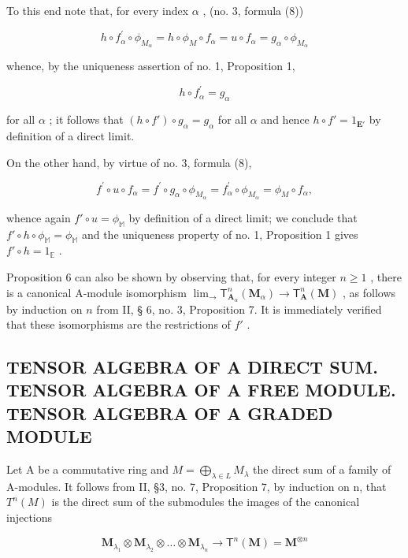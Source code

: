 To this end note that, for every index \(\alpha\) , (no. 3, formula (8))

\[
h \circ f _ {\alpha} ^ {\prime} \circ \phi_ {M _ {\alpha}} = h \circ \phi_ {M} \circ f _ {\alpha} = u \circ f _ {\alpha} = g _ {\alpha} \circ \phi_ {M _ {\alpha}}
\]

whence, by the uniqueness assertion of no. 1, Proposition 1,

\[
h \circ f _ {\alpha} ^ {\prime} = g _ {\alpha}
\]

for all \(\alpha\) ; it follows that \((h \circ f') \circ g_{\alpha} = g_{\alpha}\) for all \(\alpha\) and hence \(h \circ f' = 1_{\mathbf{E}'}\) by definition of a direct limit.

On the other hand, by virtue of no. 3, formula (8),

\[
f ^ {\prime} \circ u \circ f _ {\alpha} = f ^ {\prime} \circ g _ {\alpha} \circ \phi_ {M _ {\alpha}} = f _ {\alpha} ^ {\prime} \circ \phi_ {M _ {\alpha}} = \phi_ {M} \circ f _ {\alpha},
\]

whence again \(f' \circ u = \phi_{\mathbb{M}}\) by definition of a direct limit; we conclude that \(f' \circ h \circ \phi_{\mathbb{M}} = \phi_{\mathbb{M}}\) and the uniqueness property of no. 1, Proposition 1 gives \(f' \circ h = 1_{\mathbb{E}}\) .

Proposition 6 can also be shown by observing that, for every integer \(n \geqslant 1\) , there is a canonical A-module isomorphism \(\lim_{\longrightarrow} \mathsf{T}_{\mathbf{A}_{\alpha}}^{n}(\mathbf{M}_{\alpha}) \to \mathsf{T}_{\mathbf{A}}^{n}(\mathbf{M})\) , as follows by induction on \(n\) from II, § 6, no. 3, Proposition 7. It is immediately verified that these isomorphisms are the restrictions of \(f'\) .

\subsection{TENSOR ALGEBRA OF A DIRECT SUM. TENSOR ALGEBRA OF A FREE MODULE. TENSOR ALGEBRA OF A GRADED MODULE}

Let A be a commutative ring and \(M = \bigoplus_{\lambda \in L} M_{\lambda}\) the direct sum of a family of A-modules. It follows from II, §3, no. 7, Proposition 7, by induction on n, that \(T^{n}(M)\) is the direct sum of the submodules the images of the canonical injections

\[
\mathbf {M} _ {\lambda_ {1}} \otimes \mathbf {M} _ {\lambda_ {2}} \otimes \dots \otimes \mathbf {M} _ {\lambda_ {n}} \rightarrow \mathsf {T} ^ {n} (\mathbf {M}) = \mathbf {M} ^ {\otimes n}
\]

